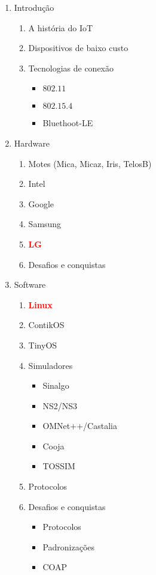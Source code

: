 \documentclass{SBCbookchapter}
\begin{document}
	\begin{enumerate}
    	\item Introdução
    		\begin{enumerate}
    			\item A história do IoT
    			\item Dispositivos de baixo custo
    			\item Tecnologias de conexão
    				\begin{itemize}
    					\item $802.11$
    					\item $802.15.4$
    					\item Bluethoot-LE
    				\end{itemize}
    		\end{enumerate}
    	\item Hardware
    		\begin{enumerate}
  	  			\item Motes (Mica, Micaz, Iris, TelosB)
    			\item Intel
    			\item Google
    			\item Samsung
    			\item \textcolor{red}{\textbf{LG}}
    			\item Desafios e conquistas
    		\end{enumerate}
    	\item Software
    		\begin{enumerate}
    			\item \textcolor{red}{\textbf{Linux}}
    			\item ContikOS
    			\item TinyOS
    			\item Simuladores
    				\begin{itemize}
    					\item Sinalgo
    					\item NS2/NS3
    					\item OMNet++/Castalia
    					\item Cooja
    					\item TOSSIM
    				\end{itemize}
    			\item Protocolos
    			\item Desafios e conquistas
    				\begin{itemize}
    					\item Protocolos
    					\item Padronizações 
    					\item COAP

\end{itemize}
\end{enumerate}
\end{enumerate}
\end{document}
